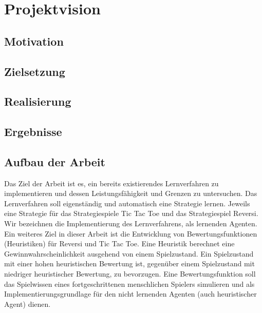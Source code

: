 \chapter{Projektvision}
\label{cha:projektvision}

\section{Motivation}

\section{Zielsetzung}

\section{Realisierung}

\section{Ergebnisse}

\section{Aufbau der Arbeit}


Das Ziel der Arbeit ist es, ein bereits existierendes Lernverfahren zu implementieren und dessen Leistungsfähigkeit und Grenzen zu untersuchen. Das Lernverfahren soll eigenständig und automatisch eine Strategie lernen. Jeweils eine Strategie für das Strategiespiele Tic Tac Toe und das Strategiespiel Reversi. Wir bezeichnen die Implementierung des Lernverfahrens, als lernenden Agenten.\\  

Ein weiteres Ziel in dieser Arbeit ist die Entwicklung von Bewertungsfunktionen (Heuristiken) für Reversi und Tic Tac Toe. Eine Heuristik berechnet eine Gewinnwahrscheinlichkeit ausgehend von einem Spielzustand. Ein Spielzustand mit einer hohen heuristischen Bewertung ist, gegenüber einem Spielzustand mit niedriger heuristischer Bewertung, zu bevorzugen. Eine Bewertungsfunktion soll das Spielwissen eines fortgeschrittenen menschlichen Spielers simulieren und als Implementierungsgrundlage für den nicht lernenden Agenten (auch heuristischer Agent) dienen.\\

